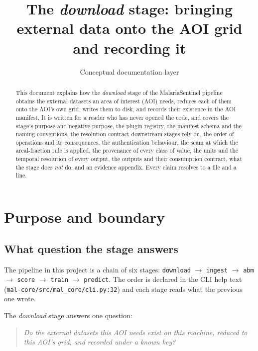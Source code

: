 \documentclass[11pt,a4paper]{article}
\title{The \emph{download} stage: bringing external data onto the AOI grid\\
and recording it}
\author{Conceptual documentation layer}
\date{}
\newcommand{\code}[1]{\texttt{#1}}
\begin{document}
\maketitle

\begin{abstract}
This document explains how the \emph{download} stage of the MalariaSentinel
pipeline obtains the external datasets an area of interest (AOI) needs, reduces
each of them onto the AOI's own grid, writes them to disk, and records their
existence in the AOI manifest. It is written for a reader who has never opened
the code, and covers the stage's purpose and negative purpose, the plugin
registry, the manifest schema and the naming conventions, the resolution
contract downstream stages rely on, the order of operations and its
consequences, the authentication behaviour, the seam at which the
areal-fraction rule is applied, the provenance of every class of value, the
units and the temporal resolution of every output, the outputs and their
consumption contract, what the stage does \emph{not} do, and
an evidence appendix. Every claim resolves to a file and a line.
\end{abstract}

\tableofcontents

\section{Purpose and boundary}

\subsection{What question the stage answers}

The pipeline in this project is a chain of six stages:
\code{download} $\rightarrow$ \code{ingest} $\rightarrow$ \code{abm} $\rightarrow$
\code{score} $\rightarrow$ \code{train} $\rightarrow$ \code{predict}. The order is
declared in the CLI help text
(\code{mal-core/src/mal\_core/cli.py:32}) and each stage reads what the previous
one wrote.

The \emph{download} stage answers one question:

\begin{quote}
\emph{Do the external datasets this AOI needs exist on this machine, reduced to
this AOI's grid, and recorded under a known key?}
\end{quote}
\end{document}
